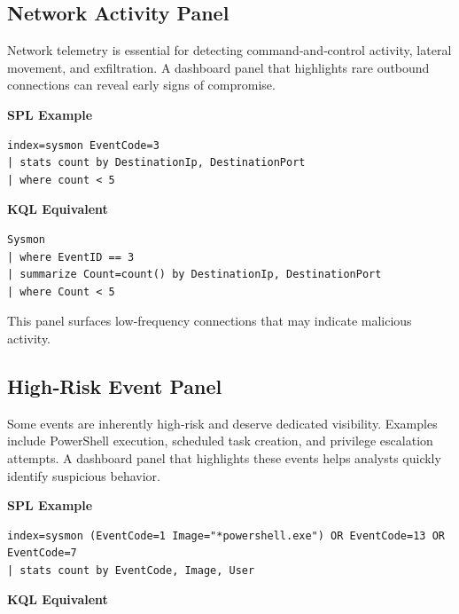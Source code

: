 
\subsection*{Network Activity Panel}

Network telemetry is essential for detecting command‑and‑control activity, lateral movement, and exfiltration. 
A dashboard panel that highlights rare outbound connections can reveal early signs of compromise.

\textbf{SPL Example}

\begin{lstlisting}
index=sysmon EventCode=3
| stats count by DestinationIp, DestinationPort
| where count < 5
\end{lstlisting}

\textbf{KQL Equivalent}

\begin{lstlisting}
Sysmon
| where EventID == 3
| summarize Count=count() by DestinationIp, DestinationPort
| where Count < 5
\end{lstlisting}

This panel surfaces low‑frequency connections that may indicate malicious activity.


\subsection*{High‑Risk Event Panel}

Some events are inherently high‑risk and deserve dedicated visibility. Examples include PowerShell execution, 
scheduled task creation, and privilege escalation attempts. A dashboard panel that highlights these events helps 
analysts quickly identify suspicious behavior.

\textbf{SPL Example}

\begin{lstlisting}
index=sysmon (EventCode=1 Image="*powershell.exe") OR EventCode=13 OR EventCode=7
| stats count by EventCode, Image, User
\end{lstlisting}

\textbf{KQL Equivalent}

